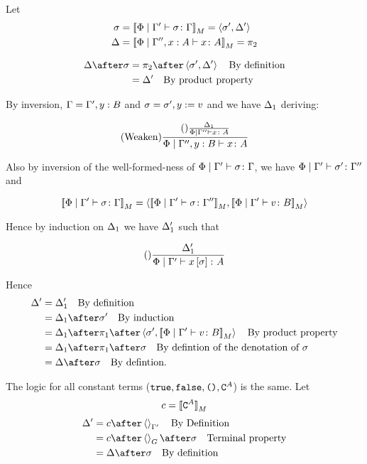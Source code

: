 \documentclass{report}
\begin{document}
Let 
\begin{align}
    \sigma &={\bf [\![}\Phi\mid\Gamma' \vdash \sigma \colon \Gamma{\bf ]\!]}_M = \left\langle\sigma', \Delta'\right\rangle\\
    \Delta &={\bf [\![}\Phi\mid\Gamma'', x:A \vdash x \colon A{\bf ]\!]}_M = \pi_2\\
\end{align}

\begin{align}
    \D\after\si &= \pp\after\pr{\si'}{\D'}\qt{By definition}\\
    &= \D'\qt{By product property}
\end{align}


By inversion, $\Gamma = \Gamma', y:B$ and $\sigma = \sigma', y:= v$
and we have $\Delta_1$ deriving:

\begin{equation}
    (\text{Weaken}) \frac{(\text{}) \frac{\Delta_1}{\Phi\mid\Gamma'' \vdash x \colon A}}{\Phi\mid\Gamma'',y: B \vdash x \colon A}
\end{equation}

Also by inversion of the well-formed-ness of $\Phi\mid\Gamma' \vdash \sigma \colon \Gamma$, we have $\Phi\mid\Gamma' \vdash \sigma' \colon \Gamma''$ and 

\begin{equation}
    {\bf [\![}\Phi\mid\Gamma' \vdash \sigma \colon \Gamma{\bf ]\!]}_M = \left\langle{\bf [\![}\Phi\mid\Gamma' \vdash \sigma \colon \Gamma''{\bf ]\!]}_M, {\bf [\![}\Phi\mid\Gamma' \vdash v \colon B{\bf ]\!]}_M\right\rangle
\end{equation}

Hence by induction on $\Delta_1$ we have $\Delta_1'$ such that

\begin{equation}
    (\text{}) \frac{\Delta_1'}{\Phi\mid\Gamma' \vdash x\left[\sigma\right] \colon A}
\end{equation}



Hence
\begin{align}
    \D' & = \D_1' \qt{By definition}\\
        & = \D_1\after\si'\qt{By induction}\\
        & = \D_1\after\p\after\pr{\si'}{\deno{\etyperelation{\P}{\G'}{v}{B}}}\qt{By product property}\\
        & = \D_1\after\p\after\si\qt{By defintion of the denotation of $\si$}\\
        & = \D\after\si\qt{By defintion.}
\end{align}

The logic for all constant terms ($\texttt{true},\texttt{false},\texttt{()},\texttt{C}^{A}$) is the same.
Let
\begin{equation}
    c = {\bf [\![}\texttt{C}^{A}{\bf ]\!]}_M
\end{equation}
\begin{align}
    \D' & = c\after\term{\G'}\qt{By Definition}\\
        & = c\after\term{G}\after\si\qt{Terminal property}\\
        & = \D\after\si\qt{By definition}
\end{align}
\end{document}
